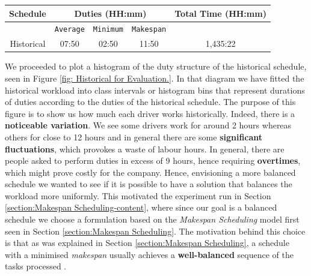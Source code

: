 \begin{table}[h]
\small
    \centering 
    \begin{tabular}{|c|c|c|c|c|}
        \hline
        \textbf{Schedule} & \multicolumn{3}{|c|}{ \textbf{Duties (HH:mm)}} & \textbf{Total Time (HH:mm)}  \\
        \hline
        & \texttt{Average} &  \texttt{Minimum} & \texttt{Makespan} & \\
        \hline
        Historical & 07:50 & 02:50 & 11:50 & 1,435:22 \\
        \hline
    \end{tabular}%
    \medbreak
\end{table}
\vspace{\baselineskip}
\noindent
We proceeded to plot a histogram of the duty structure of the historical schedule, seen in Figure \ref{fig: Historical for Evaluation.}. In that diagram we have fitted the historical workload into class intervals or histogram bins that represent durations of duties according to the duties of the historical schedule. The purpose of this figure is to show us how much each driver works historically. Indeed, there is a \textbf{noticeable variation}. We see some drivers work for around 2 hours whereas others for close to 12 hours and in general there are some \textbf{significant fluctuations}, which provokes a waste of labour hours. In general, there are people asked to perform duties in excess of 9 hours, hence requiring \textbf{overtimes}, which might prove costly for the company. Hence, envisioning a more balanced schedule we wanted to see if it is possible to have a solution that balances the workload more uniformly. This motivated the experiment run in Section \ref{section:Makespan Scheduling-content}, where since our goal is a balanced schedule we choose a formulation based on the \textit{Makespan Scheduling} model first seen in Section \ref{section:Makespan Scheduling}. The motivation behind this choice is that as was explained in Section \ref{section:Makespan Scheduling}, a schedule with a minimised \textit{makespan} usually achieves a \textbf{well-balanced} sequence of the tasks processed \cite{DUMMY:2}.



